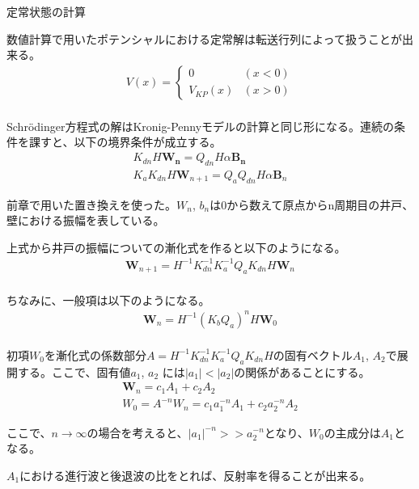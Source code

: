 \documentclass[a4paper, lualatex]{bxjsarticle}
\begin{document}
\begin{section}{定常状態の計算}
    \par 数値計算で用いたポテンシャルにおける定常解は転送行列によって扱うことが出来る。
    \begin{align}
     V(x)=\begin{cases}0&(x<0)\\V_{KP}(x)&(x>0)\end{cases}\nonumber\\
    \end{align}
    \par Schrödinger方程式の解はKronig-Pennyモデルの計算と同じ形になる。連続の条件を課すと、以下の境界条件が成立する。
    \begin{align}
     K_{dn} H \mathbf{W_n} = Q_{dn} H \alpha \mathbf{B_n}\nonumber\\
        K_{a} K_{dn} H \mathbf{W}_{n+1} = Q_a Q_{dn} H \alpha \mathbf{B}_n
    \end{align}
    \par 前章で用いた置き換えを使った。$W_n$, $b_n$は0から数えて原点からn周期目の井戸、壁における振幅を表している。
    \par 上式から井戸の振幅についての漸化式を作ると以下のようになる。
    \begin{align}
     \mathbf{W}_{n+1}= H^{-1} K_{dn}^{-1} K_a^{-1} Q_a K_{dn} H \mathbf{W}_n\nonumber\\
    \end{align}
    \par ちなみに、一般項は以下のようになる。
    \begin{align}
     \mathbf{W}_n = H^{-1} \left( K_b Q_a \right)^n H \mathbf{W}_0\nonumber\\
    \end{align}
    \par 初項$W_0$を漸化式の係数部分$A = H^{-1} K_{dn}^{-1} K_a^{-1} Q_a K_{dn} H$の固有ベクトル$A_1$, $A_2$で展開する。ここで、固有値$a_1$, $a_2$ には$|a_1|<|a_2|$の関係があることにする。
    \begin{align}
     \mathbf{W}_n = c_1 A_1 + c_2 A_2\nonumber\\
      W_0 = A^{-n} W_n = c_1 a_1^{-n} A_1 + c_2 a_2^{-n} A_2
    \end{align}
    \par ここで、$n \rightarrow \infty$の場合を考えると、$|a_1|^{-n}>>a_2^{-n}$となり、$W_0$の主成分は$A_1$となる。
    \par $A_1$における進行波と後退波の比をとれば、反射率を得ることが出来る。
\end{section}
\end{document}

